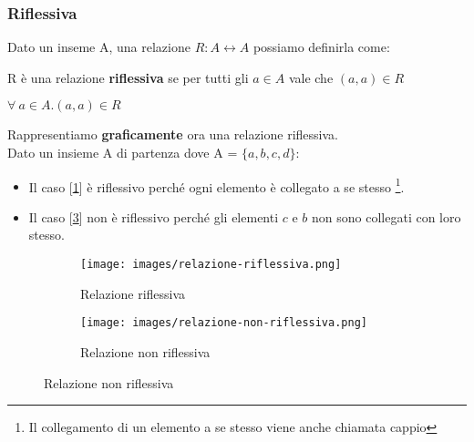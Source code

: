 \subsubsection{Riflessiva}
Dato un inseme A, una relazione $R: A \longleftrightarrow A$ possiamo definirla come:
\begin{definition}[Riflessiva]
    R è una relazione \textbf{riflessiva} se per tutti gli $a \in A$ vale che $(a, a) \in R$
    \begin{center}
        $\forall \: a \in A . (a, a) \in R$
    \end{center}
\end{definition}
Rappresentiamo \textbf{graficamente} ora una relazione riflessiva. \\Dato un insieme A di partenza dove A = $\{a, b, c, d\}$:
\begin{itemize}
    \item Il caso [\ref{fig:relazione-riflessiva}] è riflessivo perché ogni elemento è collegato a se stesso \footnote{Il collegamento di un elemento a se stesso viene anche chiamata cappio}.
    \item Il caso [\ref{fig:relazione-non-riflessiva}] non è riflessivo perché gli elementi $c$ e $b$ non sono collegati con loro stesso.
\end{itemize}
\begin{figure}[h!]
    \vspace{-15pt}
    \centering
    \begin{subfigure}{.3\textwidth}
        \centering
        \texttt{[image: images/relazione-riflessiva.png]}
        \caption{Relazione riflessiva}
        \label{fig:relazione-riflessiva}
    \end{subfigure}
    \hspace{1.5cm}
    \begin{subfigure}{.3\textwidth}
        \centering
        \texttt{[image: images/relazione-non-riflessiva.png]}
        \caption{Relazione non riflessiva}
        \label{fig:relazione-non-riflessiva}
    \end{subfigure}
\end{figure}
